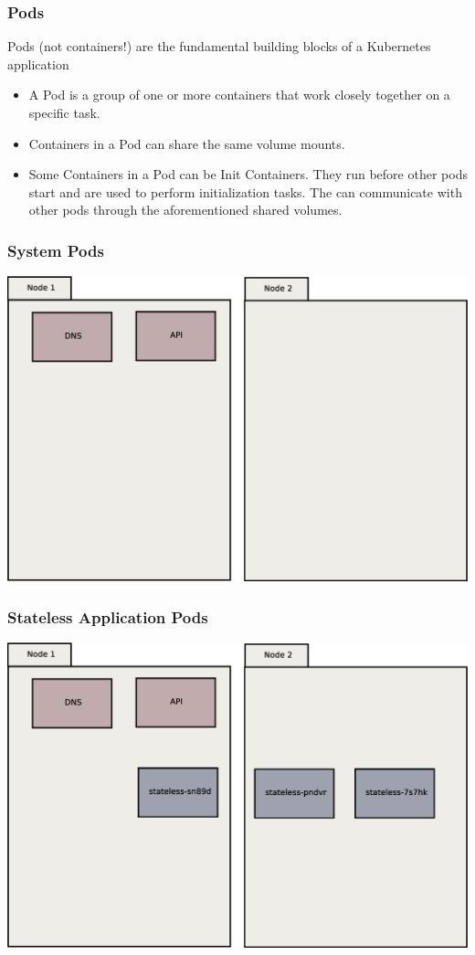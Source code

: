 \documentclass{beamer}
\begin{document}
\begin{frame}
\frametitle{Pods}
Pods (not containers!) are the fundamental building blocks of a Kubernetes application
\begin{itemize}
    \item A Pod is a group of one or more containers that work closely together on a specific task.
    \item Containers in a Pod can share the same volume mounts.
    \item Some Containers in a Pod can be Init Containers. They run before other pods start and are used to perform initialization tasks. The can communicate with other pods through the aforementioned shared volumes.
\end{itemize}
\end{frame}

\begin{frame}
    \frametitle{System Pods}
    \includegraphics[width=\textwidth,height=\textheight,keepaspectratio]{graphics/01-systemPods.eps}
\end{frame}

\begin{frame}
    \frametitle{Stateless Application Pods}
    \includegraphics[width=\textwidth,height=\textheight,keepaspectratio]{graphics/02-statelessAppPods.eps}
\end{frame}
\end{document}
